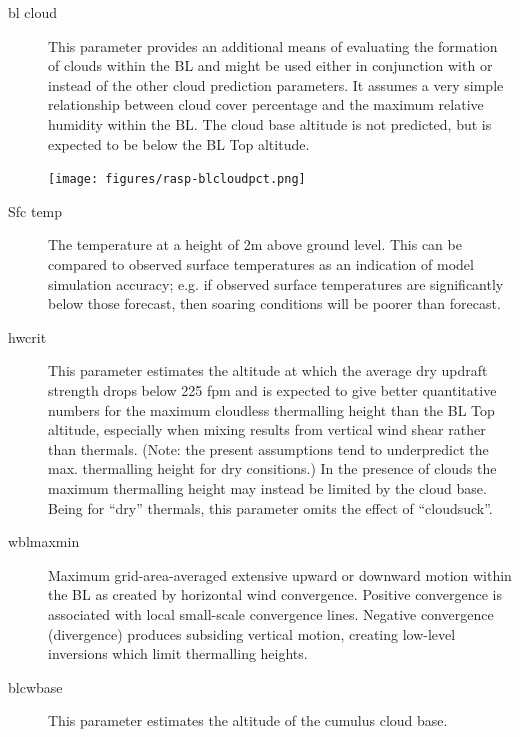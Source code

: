 \begin{description}
\item[bl cloud]  
This parameter provides an additional means of evaluating the
formation of clouds within the BL and might be used either in
conjunction with or instead of the other cloud prediction parameters.
It assumes a very simple relationship between cloud cover percentage
and the maximum relative humidity within the BL.  The cloud base
altitude is not predicted, but is expected to be below the BL Top
altitude.

\begin{center}
\texttt{[image: figures/rasp-blcloudpct.png]}
\end{center}

\item[Sfc temp] 
The temperature at a height of 2m above ground level.  This can be
compared to observed surface temperatures as an indication of model
simulation accuracy; e.g. if observed surface temperatures are
significantly below those forecast, then soaring conditions will be
poorer than forecast.
\item[hwcrit]  
This parameter estimates the altitude at which the average dry updraft
strength drops below 225 fpm and is expected to give better
quantitative numbers for the maximum cloudless thermalling height than
the BL Top altitude, especially when mixing results from vertical wind
shear rather than thermals.  (Note: the present assumptions tend to
underpredict the max. thermalling height for dry consitions.) In the
presence of clouds the maximum thermalling height may instead be
limited by the cloud base.  Being for ``dry'' thermals, this parameter
omits the effect of ``cloudsuck''.
\item[wblmaxmin]  
Maximum grid-area-averaged extensive upward or downward motion within
the BL as created by horizontal wind convergence. Positive convergence
is associated with local small-scale convergence lines.  Negative
convergence (divergence) produces subsiding vertical motion, creating
low-level inversions which limit thermalling heights.
\item[blcwbase] This parameter estimates the altitude of the cumulus cloud
base.
\end{description}


